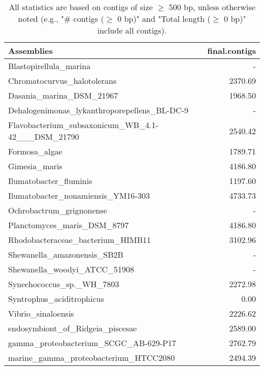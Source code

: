 \documentclass[12pt,a4paper]{article}
\begin{document}
\begin{table}[ht]
\begin{center}
\caption{All statistics are based on contigs of size $\geq$ 500 bp, unless otherwise noted (e.g., "\# contigs ($\geq$ 0 bp)" and "Total length ($\geq$ 0 bp)" include all contigs).}
\begin{tabular}{|l*{1}{|r}|}
\hline
Assemblies & final.contigs \\ \hline
Blastopirellula\_marina & - \\ \hline
Chromatocurvus\_halotolerans & 2370.69 \\ \hline
Dasania\_marina\_DSM\_21967 & 1968.50 \\ \hline
Dehalogenimonas\_lykanthroporepellens\_BL-DC-9 & - \\ \hline
Flavobacterium\_subsaxonicum\_WB\_4.1-42\_\_\_DSM\_21790 & 2540.42 \\ \hline
Formosa\_algae & 1789.71 \\ \hline
Gimesia\_maris & 4186.80 \\ \hline
Ilumatobacter\_fluminis & 1197.60 \\ \hline
Ilumatobacter\_nonamiensis\_YM16-303 & 4733.73 \\ \hline
Ochrobactrum\_grignonense & - \\ \hline
Planctomyces\_maris\_DSM\_8797 & 4186.80 \\ \hline
Rhodobacteraceae\_bacterium\_HIMB11 & 3102.96 \\ \hline
Shewanella\_amazonensis\_SB2B & - \\ \hline
Shewanella\_woodyi\_ATCC\_51908 & - \\ \hline
Synechococcus\_sp.\_WH\_7803 & 2272.98 \\ \hline
Syntrophus\_aciditrophicus & 0.00 \\ \hline
Vibrio\_sinaloensis & 2226.62 \\ \hline
endosymbiont\_of\_Ridgeia\_piscesae & 2589.00 \\ \hline
gamma\_proteobacterium\_SCGC\_AB-629-P17 & 2762.79 \\ \hline
marine\_gamma\_proteobacterium\_HTCC2080 & 2494.39 \\ \hline
\end{tabular}
\end{center}
\end{table}
\end{document}
